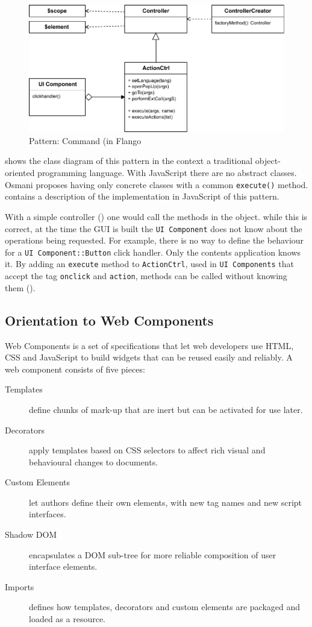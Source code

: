 \begin{figure}[htb]
    \centering
    \includegraphics{figures/design-patterns-command-flango.pdf}
    \caption{Pattern: Command (in Flango \cm}
    \label{fig:design-command-flango}
\end{figure}

 shows the class diagram of this pattern in the context a traditional object-oriented programming language.
With JavaScript there are no abstract classes.
Osmani \cite{Osmani:2012} proposes having only concrete classes with a common \texttt{execute()} method.
 contains a description of the implementation in JavaScript of this pattern.

With a simple controller () one would call the methods in the object.
while this is correct, at the time the \ac{GUI} is built the \texttt{UI Component} does not know about the operations being requested.
For example, there is no way to define the behaviour for a \texttt{UI Component::Button} click handler.
Only the contents application knows it.
By adding an \texttt{execute} method to \texttt{ActionCtrl}, used in \texttt{UI Components} that accept the tag \texttt{onclick} and \texttt{action}, methods can be called without knowing them ().

\subsection{Orientation to Web Components}
Web Components is a set of specifications that let web developers use \ac{HTML}, \ac{CSS} and JavaScript to build widgets that can be reused easily and reliably.
A web component consists of five pieces\cite{W3CComponents:2013}:
\begin{description}
    \item[Templates] define chunks of mark-up that are inert but can be activated for use later.
    \item[Decorators] apply templates based on CSS selectors to affect rich visual and behavioural changes to documents.
    \item[Custom Elements] let authors define their own elements, with new tag names and new script interfaces.
    \item[Shadow DOM]  encapsulates a DOM sub-tree for more reliable composition of user interface elements.
    \item[Imports] defines how templates, decorators and custom elements are packaged and loaded as a resource.
\end{description}

